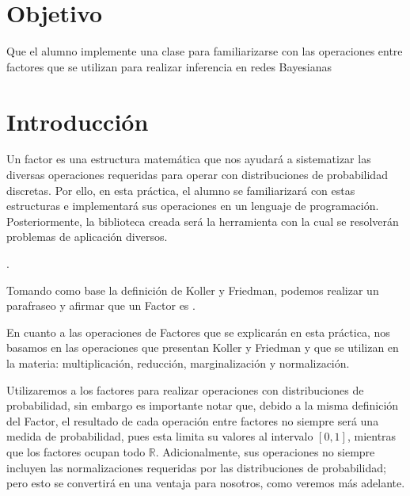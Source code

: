 \section{Objetivo}

Que el alumno implemente una clase  para familiarizarse con las operaciones entre factores que se utilizan para realizar inferencia en redes Bayesianas

\section{Introducción}

Un factor es una estructura matemática que nos ayudará a sistematizar las diversas operaciones requeridas para operar con distribuciones de probabilidad discretas.  Por ello, en esta práctica, el alumno se familiarizará con estas estructuras e implementará sus operaciones en un lenguaje de programación.  Posteriormente, la biblioteca creada será la herramienta con la cual se resolverán problemas de aplicación diversos.

\begin{definition}[Factor]
 
 \parencite[104]{KollerFriedman2009}.
\end{definition}

Tomando como base la definición de Koller y Friedman, podemos realizar un parafraseo y afirmar que un Factor es .

En cuanto a las operaciones de Factores que se explicarán en esta práctica, nos basamos en las operaciones que presentan Koller y Friedman y que se utilizan en la materia: multiplicación, reducción, marginalización y normalización.

Utilizaremos a los factores para realizar operaciones con distribuciones de probabilidad, sin embargo es importante notar que, debido a la misma definición del Factor, el resultado de cada operación entre factores no siempre será una medida de probabilidad, pues esta limita su valores al intervalo $[0,1]$, mientras que los factores ocupan todo \(\mathbb{R}\).  Adicionalmente, sus operaciones no siempre incluyen las normalizaciones requeridas por las distribuciones de probabilidad; pero esto se convertirá en una ventaja para nosotros, como veremos más adelante.

